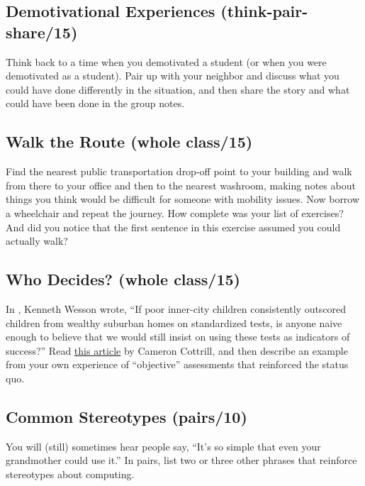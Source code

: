\subsection{Demotivational Experiences (think-pair-share/15)}\label{demotivational-experiences-think-pair-share15}

Think back to a time when you demotivated a student (or when you were
demotivated as a student). Pair up with your neighbor and discuss what
you could have done differently in the situation, and then share the
story and what could have been done in the group notes.

\subsection{Walk the Route (whole class/15)}\label{walk-the-route-whole-class15}

Find the nearest public transportation drop-off point to your building
and walk from there to your office and then to the nearest washroom,
making notes about things you think would be difficult for someone with
mobility issues. Now borrow a wheelchair and repeat the journey. How
complete was your list of exercises? And did you notice that the first
sentence in this exercise assumed you could actually walk?

\subsection{Who Decides? (whole class/15)}\label{who-decides-whole-class15}

In \cite{Litt2004}, Kenneth Wesson wrote, ``If poor inner-city
children consistently outscored children from wealthy suburban homes
on standardized tests, is anyone naive enough to believe that we would
still insist on using these tests as indicators of success?'' Read
\href{https://mobile.nytimes.com/2016/04/10/upshot/why-talented-black-and-hispanic-students-can-go-undiscovered.html}{this article} by Cameron Cottrill, and then
describe an example from your own experience of ``objective''
assessments that reinforced the status quo.

\subsection{Common Stereotypes (pairs/10)}\label{common-stereotypes-pairs10}

You will (still) sometimes hear people say, ``It's so simple that even
your grandmother could use it.'' In pairs, list two or three other
phrases that reinforce stereotypes about computing.

